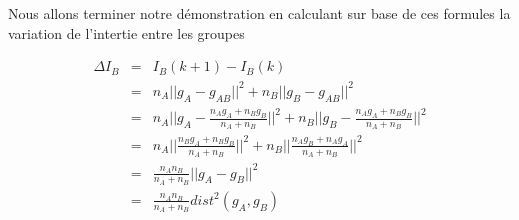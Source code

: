 \documentclass[a4paper, 11pt, onecolumn]{article}
\begin{document}
\begin{enumerate}
Nous allons terminer notre démonstration en calculant sur base de ces formules la variation de l'intertie entre les groupes

\begin{framed}
\begin{eqnarray}
\Delta I_B &=& I_B(k+1)-I_B(k)\\
&=& n_A||g_A-g_{AB}||^2+n_B||g_B-g_{AB}||^2\\
&=& n_A||g_A-\frac{n_Ag_A+n_Bg_B}{n_A+n_B}||^2+n_B||g_B-\frac{n_Ag_A+n_Bg_B}{n_A+n_B}||^2\\
&=& n_A||\frac{n_Bg_A+n_Bg_B}{n_A+n_B}||^2+n_B||\frac{n_Ag_B+n_Ag_A}{n_A+n_B}||^2\\
&=& \frac{n_An_B}{n_A+n_B}||g_A-g_B||^2\\
&=& \frac{n_An_B}{n_A+n_B}dist^2(g_A,g_B)
\end{eqnarray}
\end{framed}

\end{enumerate}
\end{document}
